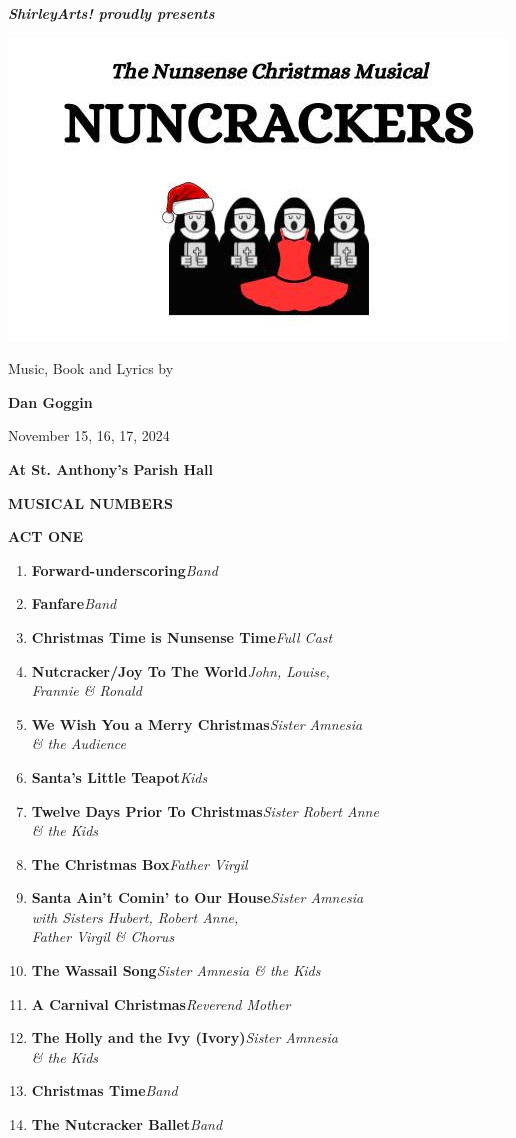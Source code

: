 \documentclass[12pt, a5paper, oneside]{article}
\begin{document}
\newcommand\song[2]{\item\raggedright\textbf{#1}\dotfill \raggedleft\emph{#2}\par}
\newcommand\cast[2]{\textbf{#2}\dotfill \emph{#1}\newline}
\pagestyle{empty} %
\setlength\parindent{0em} %

\begin{center}

\huge \textbf{\emph{ShirleyArts! proudly presents}}

\includegraphics[scale=2.0]{media/nuncrackers_logo.jpg}

Music, Book and Lyrics by

\textbf{Dan Goggin}

\Large 
\hfill \break

November 15, 16, 17, 2024

\textbf{At St. Anthony's Parish Hall}
\end{center}

\pagebreak
\begin{center}
\Large \textbf{MUSICAL NUMBERS}
\end{center}

\large \textbf{ACT ONE}
\normalsize

\begin{enumerate}
\song{Forward-underscoring}{Band}
\song{Fanfare}{Band}
\song{Christmas Time is Nunsense Time}{Full Cast}
\song{Nutcracker/Joy To The World}{John, Louise, \\Frannie \& Ronald}
\song{We Wish You a Merry Christmas}{Sister Amnesia \\\& the Audience}
\song{Santa's Little Teapot}{Kids}
\song{Twelve Days Prior To Christmas}{Sister Robert Anne \\\& the Kids}
\song{The Christmas Box}{Father Virgil}
\song{Santa Ain't Comin' to Our House}{Sister Amnesia \\with Sisters Hubert, Robert Anne,\\ Father Virgil \& Chorus}
\song{The Wassail Song}{Sister Amnesia \& the Kids}
\song{A Carnival Christmas}{Reverend Mother}
\song{The Holly and the Ivy (Ivory)}{Sister Amnesia \\ \& the Kids}
\song{Christmas Time}{Band}
\song{The Nutcracker Ballet}{Band}
\end{enumerate}
\end{document}
